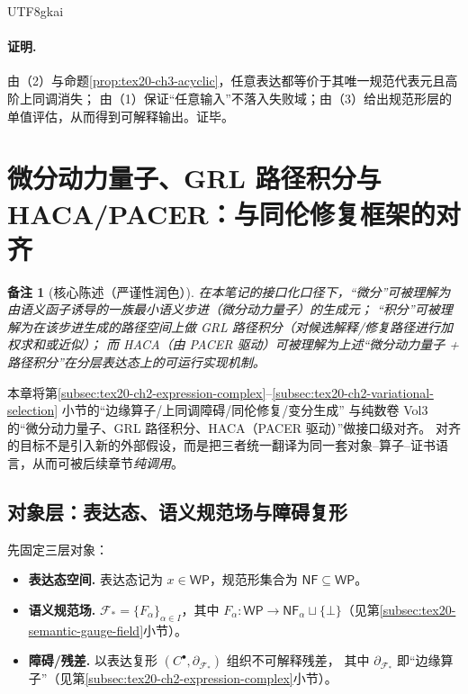 \documentclass[12pt]{article}
\newtheorem{remark}{备注}[section]
\begin{document}
\begin{CJK*}{UTF8}{gkai}
\paragraph{证明.}
由（2）与命题\ref{prop:tex20-ch3-acyclic}，任意表达都等价于其唯一规范代表元且高阶上同调消失；
由（1）保证“任意输入”不落入失败域；由（3）给出规范形层的单值评估，从而得到可解释输出。证毕。

\clearpage

\section{微分动力量子、\textsf{GRL} 路径积分与 \textsf{HACA}/\textsf{PACER}：与同伦修复框架的对齐}

\begin{remark}[核心陈述（严谨性润色）]
在本笔记的接口化口径下，“微分”可被理解为由语义函子诱导的一族\emph{最小语义步进}（微分动力量子）的生成元；
“积分”可被理解为在该步进生成的路径空间上做 \textsf{GRL} 路径积分（对候选解释/修复路径进行加权求和或近似）；
而 \textsf{HACA}（由 \textsf{PACER} 驱动）可被理解为上述“微分动力量子 + 路径积分”在分层表达态上的可运行实现机制。\cite{GaoZhengAppVol3}
\end{remark}

本章将第\ref{subsec:tex20-ch2-expression-complex}--\ref{subsec:tex20-ch2-variational-selection} 小节的“边缘算子/上同调障碍/同伦修复/变分生成”
与纯数卷 Vol3 的“微分动力量子、\textsf{GRL} 路径积分、\textsf{HACA}（\textsf{PACER} 驱动）”做接口级对齐。
对齐的目标不是引入新的外部假设，而是把三者统一翻译为同一套对象--算子--证书语言，从而可被后续章节\emph{纯调用}。

\subsection{对象层：表达态、语义规范场与障碍复形}
\label{subsec:tex20-ch4-three-layers}

先固定三层对象：
\begin{itemize}
  \item \textbf{表达态空间.} 表达态记为 $x\in\mathsf{WP}$，规范形集合为 $\mathsf{NF}\subseteq \mathsf{WP}$。
  \item \textbf{语义规范场.} $\mathcal{F}_\ast=\{F_\alpha\}_{\alpha\in I}$，其中
  $F_\alpha:\mathsf{WP}\to \mathsf{NF}_\alpha\sqcup\{\bot\}$（见第\ref{subsec:tex20-semantic-gauge-field}小节）。
  \item \textbf{障碍/残差.} 以表达复形 $(C^\bullet,\partial_{\mathcal{F}_\ast})$ 组织不可解释残差，
  其中 $\partial_{\mathcal{F}_\ast}$ 即“边缘算子”（见第\ref{subsec:tex20-ch2-expression-complex}小节）。
\end{itemize}


\end{CJK*}
\end{document}
